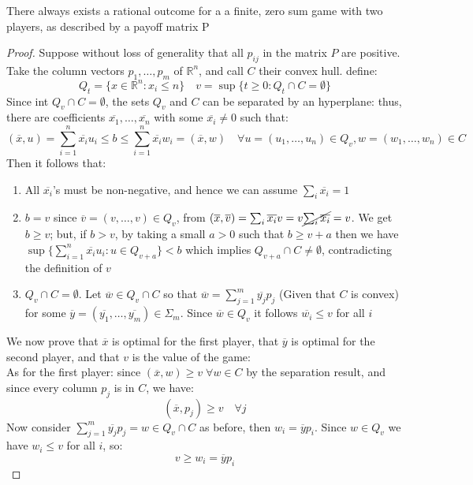 \documentclass[../main.tex]{subfiles}
\begin{document}
\begin{theorem}
    There always exists a rational outcome for a a finite, zero sum game with two players, as described by a payoff matrix P
\end{theorem}
\begin{proof}
    Suppose without loss of generality that all $p_{ij}$ in the matrix $P$ are positive. Take the column vectors $p_1, \ldots, p_m$ of $\mathbb{R}^n$, and call $C$ their convex hull. define:
    \[
        Q_t = \{x \in \mathbb{R}^n : x_i \leq n\} \quad v = \sup \{t \geq 0 : Q_t \cap C = \emptyset\}
    \]
    Since int $Q_v \cap C = \emptyset$, the sets $Q_v$ and $C$ can be separated by an hyperplane: thus, there are coefficients $\overline{x_1}, \ldots, \overline{x_n}$ with some $\overline{x_i} \neq 0$ such that:
    \[
        (\overline{x}, u) = \sum_{i=1}^n \overline{x_i} u_i \leq b \leq \sum_{i=1}^n \overline{x_i} w_i = (\overline{x}, w) \quad \forall u = (u_1, \ldots, u_n) \in Q_v, w = (w_1, \ldots, w_n) \in C
    \]
    Then it follows that:
    \begin{enumerate}
        \item All $\overline{x_i}$'s must be non-negative, and hence we can assume $\sum_i \overline{x_i} = 1$
        \item $b = v$ since $\overline{v} = (v, \ldots, v) \in Q_v$, from $(\overline{x}, \overline{v}) = \sum_i \overline{x_i}v = v \cancel{\sum_i \overline{x_i}} = v$. We get $b \geq v$; but, if $b > v$, by taking a small $a > 0$ such that $b \geq v+a$ then we have $\sup \{\sum_{i=1}^n \overline{x_i} u_i : u \in Q_{v+a}\} < b$ which implies $Q_{v+a} \cap C \neq \emptyset$, contradicting the definition of $v$
        \item $Q_v \cap C = \emptyset$. Let $\overline{w} \in Q_v \cap C$ so that $\overline{w} = \sum_{j=1}^{m} \overline{y_j}p_j$ (Given that $C$ is convex) for some $\overline{y} = (\overline{y_1}, \ldots, \overline{y_m}) \in \Sigma_m$. Since $\overline{w} \in Q_v$ it follows $\overline{w_i} \leq v$ for all $i$
    \end{enumerate}
    We now prove that $\overline{x}$ is optimal for the first player, that $\overline{y}$ is optimal for the second player, and that $v$ is the value of the game:\\
    As for the first player: since $(\overline{x}, w) \geq v \; \forall w \in C$ by the separation result, and since every column $p_j$ is in $C$, we have:
    \[
        (\overline{x}, p_j) \geq v \quad \forall j
    \]
    Now consider $\sum_{j=1}^m \overline{y_j}p_j = w \in Q_v \cap C$ as before, then $w_i = \overline{y} p_i$. Since $w \in Q_v$ we have $w_i \leq v$ for all $i$, so:
    \[
        v \geq w_i = \overline{y} p_i
    \]
\end{proof}
\end{document}
